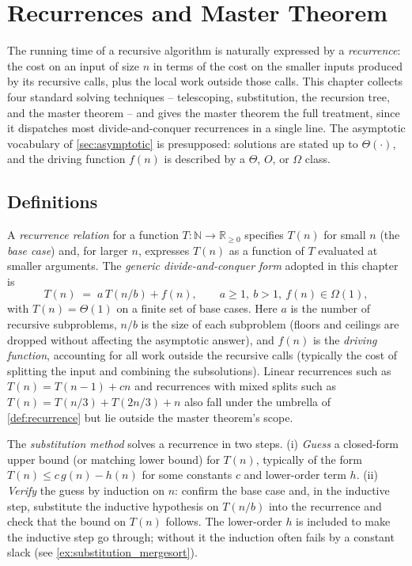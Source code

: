 \section{Recurrences and Master Theorem}
\label{sec:recurrences}

The running time of a recursive algorithm is naturally expressed by a \emph{recurrence}: the cost on an input of size $n$ in terms of the cost on the smaller inputs produced by its recursive calls, plus the local work outside those calls. This chapter collects four standard solving techniques -- telescoping, substitution, the recursion tree, and the master theorem -- and gives the master theorem the full treatment, since it dispatches most divide-and-conquer recurrences in a single line. The asymptotic vocabulary of \cref{sec:asymptotic} is presupposed: solutions are stated up to $\Theta(\cdot)$, and the driving function $f(n)$ is described by a $\Theta$, $O$, or $\Omega$ class.

\subsection{Definitions}

\begin{definition}
\label{def:recurrence}
A \emph{recurrence relation} for a function $T : \mathbb{N} \to \mathbb{R}_{\ge 0}$ specifies $T(n)$ for small $n$ (the \emph{base case}) and, for larger $n$, expresses $T(n)$ as a function of $T$ evaluated at smaller arguments. The \emph{generic divide-and-conquer form} adopted in this chapter is
\[
  T(n) \;=\; a\,T(n/b) + f(n), \qquad a \ge 1,\ b > 1,\ f(n) \in \Omega(1),
\]
with $T(n) = \Theta(1)$ on a finite set of base cases. Here $a$ is the number of recursive subproblems, $n/b$ is the size of each subproblem (floors and ceilings are dropped without affecting the asymptotic answer), and $f(n)$ is the \emph{driving function}, accounting for all work outside the recursive calls (typically the cost of splitting the input and combining the subsolutions). Linear recurrences such as $T(n) = T(n-1) + cn$ and recurrences with mixed splits such as $T(n) = T(n/3) + T(2n/3) + n$ also fall under the umbrella of \cref{def:recurrence} but lie outside the master theorem's scope.
\end{definition}

\begin{definition}
\label{def:substitution}
The \emph{substitution method} solves a recurrence in two steps. (i) \emph{Guess} a closed-form upper bound (or matching lower bound) for $T(n)$, typically of the form $T(n) \le c\,g(n) - h(n)$ for some constants $c$ and lower-order term $h$. (ii) \emph{Verify} the guess by induction on $n$: confirm the base case and, in the inductive step, substitute the inductive hypothesis on $T(n/b)$ into the recurrence and check that the bound on $T(n)$ follows. The lower-order $h$ is included to make the inductive step go through; without it the induction often fails by a constant slack (see \cref{ex:substitution_mergesort}).
\end{definition}

